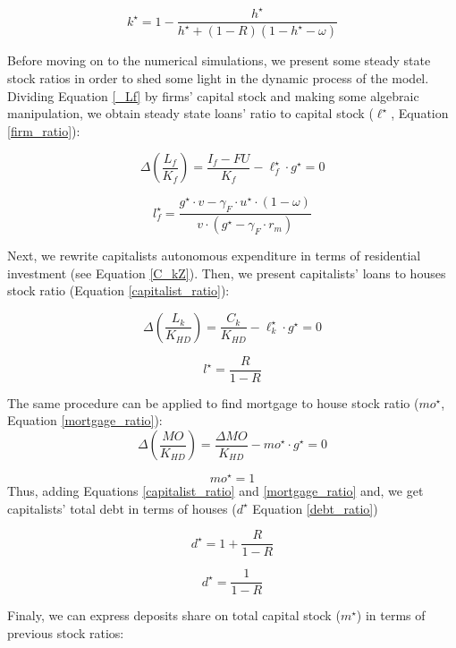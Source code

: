 \documentclass[11pt]{article}
\begin{document}
\begin{equation}
\label{k_long}
k^{\star} = 1 - \frac{h^{\star}}{h^\star + (1-R)(1-h^\star - \omega)}
\end{equation}



Before moving on to the numerical simulations, we present some steady state stock ratios in order to shed some light in the dynamic process of the model. Dividing Equation \ref{_Lf} by firms' capital stock and making some algebraic manipulation, we obtain steady state loans' ratio to capital stock (\(\ell^{\star}\), Equation \ref{firm_ratio}):

$$
\Delta \left(\frac{L_{f}}{K_{f}}\right) = \frac{I_{f} - FU}{K_{f}} - \ell^{\star}_{f}\cdot g^{\star}  = 0
$$


\begin{equation}
\label{firm_ratio}
l^\star_f = \frac{g^\star\cdot v - \gamma_F\cdot u^\star \cdot (1-\omega)}{v\cdot (g^\star - \gamma_F\cdot r_m)}
\end{equation}

Next, we rewrite capitalists autonomous expenditure in terms of residential investment (see Equation \ref{C_kZ}). 
Then, we  present capitalists' loans to houses stock ratio (Equation \ref{capitalist_ratio}):

$$
\Delta \left(\frac{L_k}{K_{HD}}\right) = \frac{C_k}{K_{HD}} - \ell^{\star}_{k}\cdot g^{\star} = 0
$$

\begin{equation}
\label{capitalist_ratio}
l^\star = \frac{R}{1-R}
\end{equation}

The same procedure can be applied to find mortgage to house stock ratio (\(mo^{\star}\), Equation \ref{mortgage_ratio}):
$$
\Delta \left(\frac{MO}{K_{HD}}\right) = \frac{\Delta MO}{K_{HD}} - mo^{\star}\cdot g^{\star} = 0
$$

\begin{equation}
\label{mortgage_ratio}
mo^\star = 1
\end{equation}
Thus, adding Equations \ref{capitalist_ratio} and \ref{mortgage_ratio} and, we get capitalists' total debt in terms of houses (\(d^\star\) Equation \ref{debt_ratio})

$$
d^\star = 1 + \frac{R}{1-R}
$$

\begin{equation}
\label{debt_ratio}
d^\star = \frac{1}{1-R}
\end{equation}

Finaly, we can express deposits share on total capital stock (\(m^{\star}\)) in terms of previous stock ratios:
\end{document}
